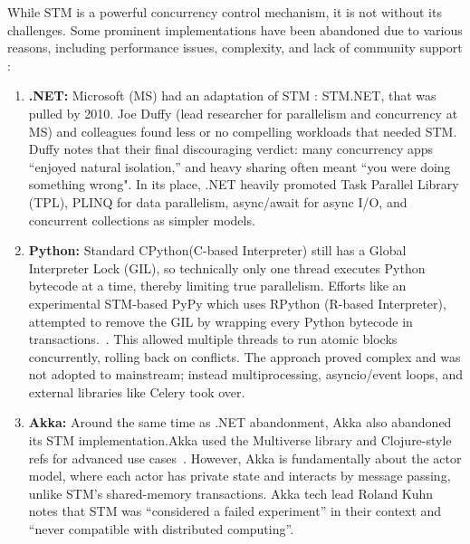 While STM is a powerful concurrency control mechanism, it is not without its challenges. Some prominent implementations have been abandoned due to various reasons, including performance issues, complexity, and lack of community support :
\begin{enumerate}
    \item \textbf{.NET:}  Microsoft (MS) had an adaptation of STM :  STM.NET, that was pulled by 2010. Joe Duffy (lead researcher for parallelism and concurrency at MS) and colleagues found less or no compelling workloads that needed STM. Duffy notes that their final discouraging verdict: many concurrency apps “enjoyed natural isolation,” and heavy sharing often meant “you were doing something wrong"\cite{infoq.com}.  In its place, .NET heavily promoted Task Parallel Library (TPL), PLINQ for data parallelism, async/await for async I/O, and concurrent collections as simpler models.
    \item \textbf{Python:}  Standard CPython(C-based Interpreter) still has a Global Interpreter Lock (GIL), so technically only one thread executes Python bytecode at a time, thereby limiting true parallelism. Efforts like an experimental STM-based PyPy which uses RPython (R-based Interpreter), attempted to remove the GIL by wrapping every Python bytecode in transactions.~\cite{pypy.org}. This allowed multiple threads to run atomic blocks concurrently, rolling back on conflicts. The approach proved complex and was not adopted to mainstream; instead multiprocessing, asyncio/event loops, and external libraries like Celery took over.
    \item \textbf{Akka:} Around the same time as .NET abandonment, Akka also abandoned its STM implementation.Akka used the Multiverse library and Clojure-style refs for advanced use cases~\cite{doc.akka.io}. 
    However, Akka is fundamentally about the actor model, where each actor has private state and interacts by message passing, unlike STM’s shared-memory transactions. Akka tech lead Roland Kuhn notes that STM was “considered a failed experiment” in their context and “never compatible with distributed computing”.
\end{enumerate}
